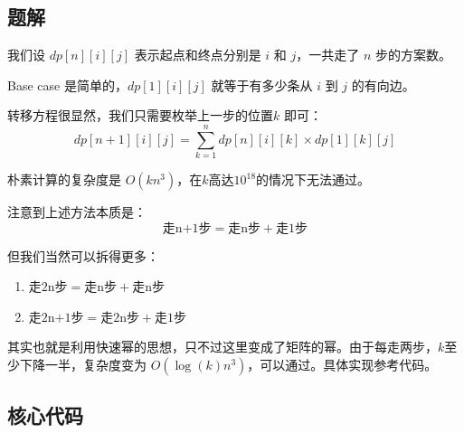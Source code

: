 \subsection*{题解}

我们设 $dp[n][i][j]$ 表示起点和终点分别是 $i$ 和 $j$，一共走了 $n$ 步的方案数。 

Base case 是简单的，$dp[1][i][j]$ 就等于有多少条从 $i$ 到 $j$ 的有向边。

转移方程很显然，我们只需要枚举上一步的位置$k$ 即可：
$$
dp[n+1][i][j] = \sum_{k = 1}^n dp[n][i][k] \times dp[1][k][j] 
$$

朴素计算的复杂度是 $O(kn^3)$，在$k$高达$10^{18}$的情况下无法通过。

注意到上述方法本质是：
$$
\text{走n+1步} = \text{走n步} + \text{走1步}
$$

但我们当然可以拆得更多：

\begin{enumerate}
    \item $\text{走2n步} = \text{走n步} + \text{走n步}$
    \item $\text{走2n+1步} = \text{走2n步} + \text{走1步}$
\end{enumerate}

其实也就是利用快速幂的思想，只不过这里变成了矩阵的幂。由于每走两步，$k$至少下降一半，复杂度变为 $O(\log(k)n^3)$，可以通过。具体实现参考代码。


\subsection*{核心代码}
\inputminted[linenos,autogobble]{cpp}{../Code/R.cpp}
\newpage